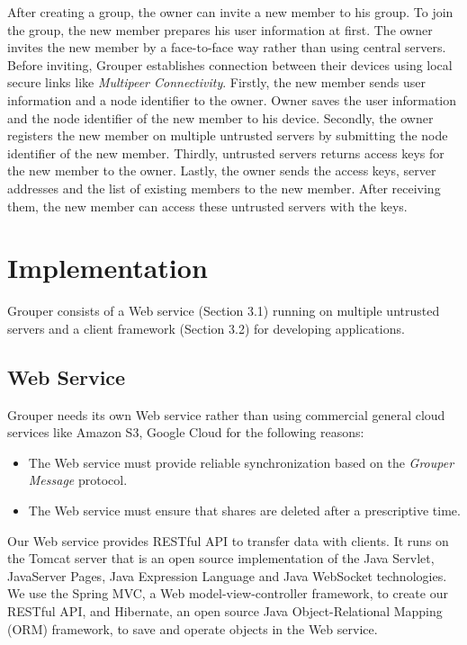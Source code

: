 \documentclass[twocolumn,10pt]{article}
\begin{document}
After creating a group, the owner can invite a new member to his group. 
To join the group, the new member prepares his user information at first. 
The owner invites the new member by a face-to-face way rather than using central servers. 
Before inviting, Grouper establishes connection between their devices using local secure links like \emph{Multipeer Connectivity}\cite{mc}. 
Firstly, the new member sends user information and a node identifier to the owner. 
Owner saves the user information and the node identifier of the new member to his device. 
Secondly, the owner registers the new member on multiple untrusted servers by submitting the node identifier of the new member. 
Thirdly, untrusted servers returns access keys for the new member to the owner. 
Lastly, the owner sends the access keys, server addresses and the list of existing members to the new member. 
After receiving them, the new member can access these untrusted servers with the keys.

\section{Implementation}

Grouper consists of a Web service (Section 3.1) running on multiple untrusted servers and a client framework (Section 3.2) for developing applications.

\subsection{Web Service}

Grouper needs its own Web service rather than using commercial general cloud services like Amazon S3, Google Cloud for the following reasons:

\begin{itemize}
	\setlength{\itemsep}{1pt}
	\setlength{\parskip}{0pt}
	\setlength{\parsep}{0pt}
	\item The Web service must provide reliable synchronization based on the \emph{Grouper Message} protocol.
	\item The Web service must ensure that shares are deleted after a prescriptive time.
\end{itemize}

Our Web service provides RESTful API to transfer data with clients. 
It runs on the Tomcat server that is an open source implementation of the Java Servlet, JavaServer Pages, Java Expression Language and Java WebSocket technologies. 
We use the Spring MVC, a  Web model-view-controller framework, to create our RESTful API, and Hibernate, an open source Java Object-Relational Mapping (ORM) framework, to save and operate objects in the Web service. 
\end{document}
